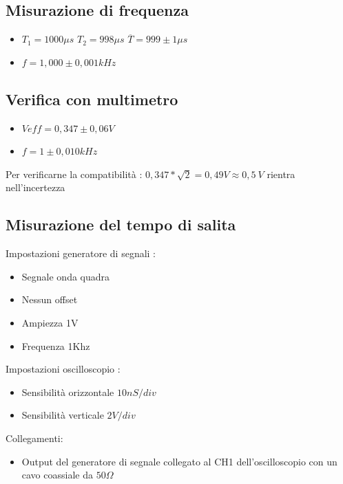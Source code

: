 \documentclass[a4paper]{article}
\begin{document}
\subsection{Misurazione di frequenza}
\begin{itemize}
\item \(T_1 = 1000 \mu s\) \(T_2 = 998 \mu s\) \(\overline{T} = 999 \pm 1 \mu s\)
\item \(f= 1,000 \pm 0,001 kHz\)
\end{itemize}

\subsection{Verifica con multimetro}
\begin{itemize}
\item \(Veff= 0,347 \pm 0,06 V \)
\item \(f= 1 \pm 0,010 kHz \)
\end{itemize}
Per verificarne la compatibilità : \(0,347 * \sqrt{2} = 0,49 V \approx 0,5\ V \) rientra nell'incertezza 

\hfill\break
\hfill\break
\hfill\break

\begin{tcolorbox}[breakable,colback=cyan,colframe=cyan]
\section*{Misurazione del tempo di salita}
\end{tcolorbox}

Impostazioni generatore di segnali :
\begin{itemize}
\item Segnale onda quadra
\item Nessun offset
\item Ampiezza 1V
\item Frequenza 1Khz
\end{itemize}

Impostazioni oscilloscopio :
\begin{itemize}
\item Sensibilità orizzontale \(10 nS/div \)
\item Sensibilità verticale \(2 V/div\)
\end{itemize}

Collegamenti:
\begin{itemize}
\item Output del generatore di segnale collegato al CH1 dell'oscilloscopio con un cavo coassiale da \(50 \Omega\)  
\end{itemize}
\end{document}
